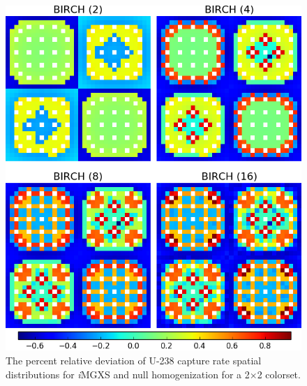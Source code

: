 \begin{figure}[h!]
\centering
\includegraphics[width=0.9\linewidth]{figures/results/compare/2x2/compare-capt}
\vspace{2mm}
\caption[U-238 capture rate comparison for a 2$\times$2 colorset]{The percent relative deviation of U-238 capture rate spatial distributions for \textit{i}\ac{MGXS} and null homogenization for a 2$\times$2 colorset.}
\label{fig:chap11-2x2-capt-rates-comp}
\end{figure}

\clearpage


